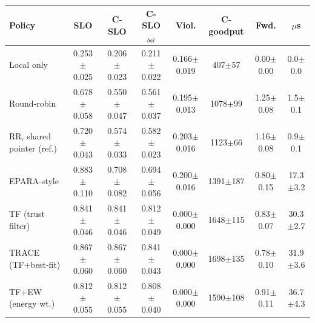 \begin{tabular}{lccccccc}
\toprule
Policy & SLO & C-SLO & C-SLO$_{bal}$ & Viol. & C-goodput & Fwd. & $\mu$s \\
\midrule
Local only & 0.253$\pm$0.025 & 0.206$\pm$0.023 & 0.211$\pm$0.022 & 0.166$\pm$0.019 & 407$\pm$57 & 0.00$\pm$0.00 & 0.0$\pm$0.0 \\
Round-robin & 0.678$\pm$0.058 & 0.550$\pm$0.047 & 0.561$\pm$0.037 & 0.195$\pm$0.013 & 1078$\pm$99 & 1.25$\pm$0.08 & 1.5$\pm$0.1 \\
RR, shared pointer (ref.) & 0.720$\pm$0.043 & 0.574$\pm$0.033 & 0.582$\pm$0.023 & 0.203$\pm$0.016 & 1123$\pm$66 & 1.16$\pm$0.08 & 0.9$\pm$0.1 \\
EPARA-style & 0.883$\pm$0.110 & 0.708$\pm$0.082 & 0.694$\pm$0.056 & 0.200$\pm$0.016 & 1391$\pm$187 & 0.80$\pm$0.15 & 17.3$\pm$3.2 \\
TF (trust filter) & 0.841$\pm$0.046 & 0.841$\pm$0.046 & 0.812$\pm$0.049 & 0.000$\pm$0.000 & 1648$\pm$115 & 0.83$\pm$0.07 & 30.3$\pm$2.7 \\
TRACE (TF+best-fit) & 0.867$\pm$0.060 & 0.867$\pm$0.060 & 0.841$\pm$0.043 & 0.000$\pm$0.000 & 1698$\pm$135 & 0.78$\pm$0.10 & 31.9$\pm$3.6 \\
TF+EW (energy wt.) & 0.812$\pm$0.055 & 0.812$\pm$0.055 & 0.808$\pm$0.040 & 0.000$\pm$0.000 & 1590$\pm$108 & 0.91$\pm$0.11 & 36.7$\pm$4.3 \\
\bottomrule
\end{tabular}
